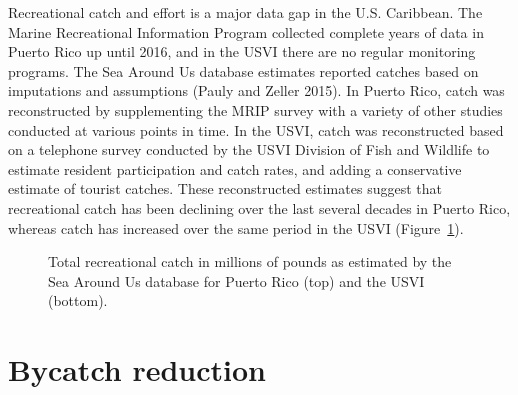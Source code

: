 \documentclass[
  letterpaper,
  oneside,
  open=any]{scrbook}
\begin{document}
Recreational catch and effort is a major data gap in the U.S. Caribbean.
The Marine Recreational Information Program collected complete years of
data in Puerto Rico up until 2016, and in the USVI there are no regular
monitoring programs. The Sea Around Us database estimates reported
catches based on imputations and assumptions (Pauly and Zeller 2015). In
Puerto Rico, catch was reconstructed by supplementing the MRIP survey
with a variety of other studies conducted at various points in time. In
the USVI, catch was reconstructed based on a telephone survey conducted
by the USVI Division of Fish and Wildlife to estimate resident
participation and catch rates, and adding a conservative estimate of
tourist catches. These reconstructed estimates suggest that recreational
catch has been declining over the last several decades in Puerto Rico,
whereas catch has increased over the same period in the USVI
(Figure~\ref{fig-reccatch}).

\begin{figure}


\caption{\label{fig-reccatch}Total recreational catch in millions of
pounds as estimated by the Sea Around Us database for Puerto Rico (top)
and the USVI (bottom).}

\end{figure}%

\section{Bycatch reduction}\label{bycatch-reduction}
\end{document}
